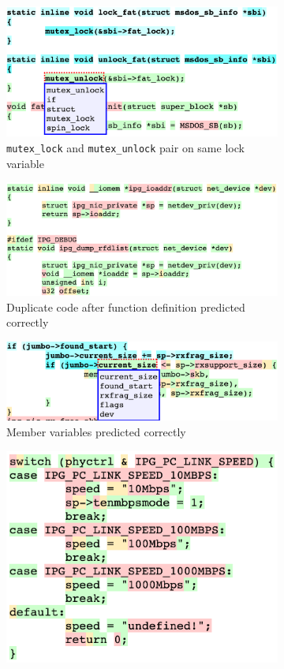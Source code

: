 \begin{figure}[t!]
  \centering
\begin{subfigure}{\linewidth}
  \includegraphics[width=\linewidth]{figs/example10.png}
  \caption{{\tt mutex\_lock} and {\tt mutex\_unlock} pair on same lock variable}
  \label{fig:lockunlock}
\end{subfigure}
\begin{subfigure}{\linewidth}
  \includegraphics[width=\linewidth]{figs/example4.png}
  \caption{Duplicate code after function definition predicted correctly}
  \label{fig:duplicate}
\end{subfigure}
\begin{subfigure}{\linewidth}
  \includegraphics[width=\linewidth]{figs/example7.png}
  \caption{Member variables predicted correctly}
  \label{fig:memvar}
\end{subfigure}
\begin{subfigure}{\linewidth}
  \includegraphics[width=0.6\linewidth]{figs/example1.png}

\end{subfigure}
\end{figure}
